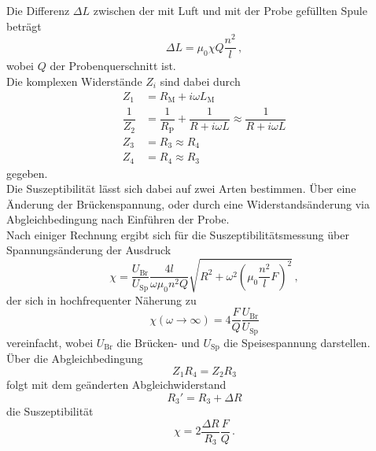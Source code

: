 Die Differenz $\Delta L$ zwischen der mit Luft und mit der Probe gefüllten Spule beträgt
\begin{equation*}
    \Delta L = \mu_0 \chi Q \dfrac{n^2}{l} \,,
\end{equation*}
wobei $Q$ der Probenquerschnitt ist. \\

Die komplexen Widerstände $Z_i$ sind dabei durch
\begin{align*}
    Z_1             &= R_\text{M} + i \omega L_\text{M} \\
    \dfrac{1}{Z_2}  &= \dfrac{1}{R_\text{P}} + \dfrac{1}{R + i \omega L} \approx \dfrac{1}{ R + i \omega L}\\
    Z_3             &= R_3                                               \approx R_4\\
    Z_4             &= R_4                                               \approx R_3
\end{align*}
gegeben. \\

Die Suszeptibilität lässt sich dabei auf zwei Arten bestimmen.
Über eine Änderung der Brückenspannung, oder durch eine Widerstandsänderung via Abgleichbedingung nach Einführen der Probe. \\

Nach einiger Rechnung ergibt sich für die Suszeptibilitätsmessung über Spannungsänderung der Ausdruck
\begin{equation*}
    \chi = \dfrac{U_\text{Br}}{U_\text{Sp}} \dfrac{4 l}{\omega \mu_0 n^2 Q} \sqrt{R^2 + \omega^2 \left(\mu_0 \dfrac{n^2}{l} F \right)^2} \,,
    \label{eq:spannsusamogus}
\end{equation*}
der sich in hochfrequenter Näherung zu
\begin{equation}
    \chi(\omega \rightarrow \infty) = 4 \dfrac{F}{Q} \dfrac{U_\text{Br}}{U_\text{Sp}}
    \label{eq:spannsussimp}
\end{equation}
vereinfacht, wobei $U_\text{Br}$ die Brücken- und $U_\text{Sp}$ die Speisespannung darstellen. \\

Über die Abgleichbedingung 
\begin{equation*}
    Z_1 R_4 = Z_2 R_3
\end{equation*}
folgt mit dem geänderten Abgleichwiderstand
\begin{equation*}
    R_3' = R_3 + \Delta R
\end{equation*}
die Suszeptibilität
\begin{equation}
    \chi = 2 \dfrac{\Delta R}{R_3} \dfrac{F}{Q} \,.
    \label{eq:widsus}
\end{equation}




